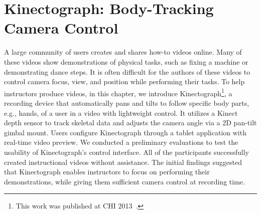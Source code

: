 \chapter{Kinectograph: Body-Tracking Camera Control}
\label{chapter_kinectograph}

A large community of users creates and shares how-to videos online. Many of these videos show demonstrations of physical tasks, such as fixing a machine or demonstrating dance steps. It is often difficult for the authors of these videos to control camera focus, view, and position while performing their tasks.
%
To help instructors produce videos, in this chapter, we introduce Kinectograph\footnote{This work was published at CHI 2013~\cite{Cheng:2013:BCC:2468356.2468568}.}, a recording device that automatically pans and tilts to follow specific body parts, e.g., hands, of a user in a video with lightweight control. It utilizes a Kinect depth sensor to track skeletal data and adjusts the camera angle via a 2D pan-tilt gimbal mount. Users configure Kinectograph through a tablet application with real-time video preview. We conducted a preliminary evaluations to test the usability of Kinectograph's control interface. All of the participants successfully created instructional videos without assistance. The initial findings suggested that Kinectograph enables instructors to focus on performing their demonstrations, while giving them sufficient camera control at recording time.








